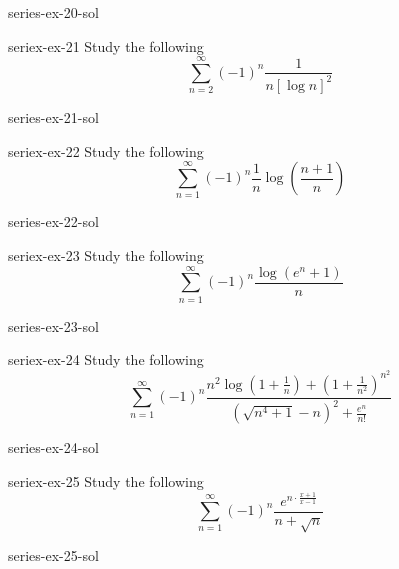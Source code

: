 \documentclass[preview]{standalone}
\begin{document}
\begin{snippetsolution}{series-ex-20-sol}{}
    \todo
\end{snippetsolution}

\begin{snippetexercise}{seriex-ex-21}{}
    Study the following \series
    \[
        \sum_{n=2}^\infty {(-1)}^n \frac{1}{n {\left[\log n\right]}^2}
    \]
\end{snippetexercise}

\begin{snippetsolution}{series-ex-21-sol}{}
    \todo
\end{snippetsolution}

\begin{snippetexercise}{seriex-ex-22}{}
    Study the following \series
    \[
        \sum_{n=1}^\infty {(-1)}^n \frac{1}{n}
        \log\left(\frac{n+1}{n}\right)
    \]
\end{snippetexercise}

\begin{snippetsolution}{series-ex-22-sol}{}
    \todo
\end{snippetsolution}

\begin{snippetexercise}{seriex-ex-23}{}
    Study the following \series
    \[
        \sum_{n=1}^\infty {(-1)}^n
        \frac{\log(e^n + 1)}{n}
    \]
\end{snippetexercise}

\begin{snippetsolution}{series-ex-23-sol}{}
    \todo
\end{snippetsolution}

\begin{snippetexercise}{seriex-ex-24}{}
    Study the following \series
    \[
        \sum_{n=1}^\infty {(-1)}^n
        \frac{
            n^2\log\left(1 + \frac{1}{n}\right)
            + {\left(1 + \frac{1}{n^2}\right)}^{n^2}
        }{
            {(\sqrt{n^4+1}-n)}^2 + \frac{e^n}{n!}
        }
    \]
\end{snippetexercise}

\begin{snippetsolution}{series-ex-24-sol}{}
    \todo
\end{snippetsolution}

\begin{snippetexercise}{seriex-ex-25}{}
    Study the following \series
    \[
        \sum_{n=1}^\infty {(-1)}^n
        \frac{e^{n \cdot \frac{x+1}{x-1}}}{n+\sqrt{n}}
    \]
\end{snippetexercise}

\begin{snippetsolution}{series-ex-25-sol}{}
    \todo
\end{snippetsolution}
\end{document}
